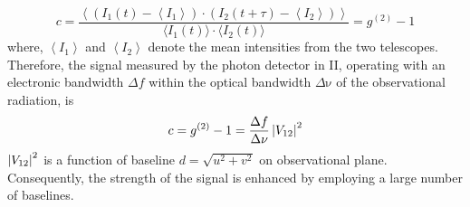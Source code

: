 \begin{equation}
	c = \frac{\left\langle \left( I_1(t) - \left\langle I_1 \right\rangle \right) \cdot \left( I_2(t + \tau) - \left\langle I_2 \right\rangle \right) \right\rangle}{\langle I_1(t) \rangle \cdot \langle I_2(t) \rangle} = g^{(2)} - 1
\end{equation}
where, $\left\langle I_1 \right\rangle$ and $\left\langle I_2 \right\rangle$ denote the mean intensities from the two telescopes. Therefore, the signal measured by the photon detector in II, operating with an electronic bandwidth $\Delta f$ within the optical bandwidth $\Delta {\mathrm {\nu}}$ of the observational radiation, is
\begin{equation}
	c = g^{(2)} - 1 = \frac{\Delta f}{\Delta \nu} \left|V_{12}\right|^2
	\label{eq:signal}
\end{equation}
$\left|V_{12}\right|^2$ is a function of baseline $d = \sqrt{u^2 + v^2}$ on observational plane. Consequently, the strength of the signal is enhanced by employing a large number of baselines.

